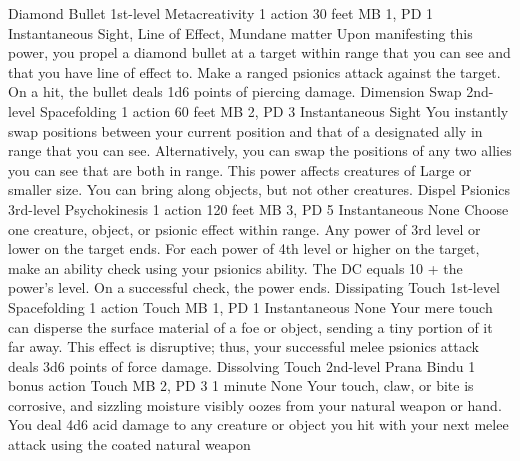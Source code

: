 \DndPowerHeader%
    {Diamond Bullet\label{pwr:diamond_bullet}}
    {1st-level Metacreativity}
    {1 action}
    {30 feet}
    {MB 1, PD 1}
    {Instantaneous}
    {Sight, Line of Effect, Mundane matter}
Upon manifesting this power, you propel a
diamond bullet at a target within range that you can see and
that you have line of effect to. Make a ranged psionics attack
against the target. On a hit, the bullet deals 1d6 points
of piercing damage.
\DndPowerHeader%
    {Dimension Swap\label{pwr:dimension_swap}}
    {2nd-level Spacefolding}
    {1 action}
    {60 feet}
    {MB 2, PD 3}
    {Instantaneous}
    {Sight}
You instantly swap positions between your
current position and that of a designated ally in range that
you can see. Alternatively, you can swap the positions of
any two allies you can see that are both in range. This power
affects creatures of Large or smaller size. You can bring
along objects, but not other creatures.
\DndPowerHeader%
    {Dispel Psionics\label{pwr:dispel_psionics}}
    {3rd-level Psychokinesis}
    {1 action}
    {120 feet}
    {MB 3, PD 5}
    {Instantaneous}
    {None}
Choose one creature, object, or psionic effect
within range. Any power of 3rd level or lower on the target
ends. For each power of 4th level or higher on the target,
make an ability check using your psionics ability. The DC
equals 10 + the power's level. On a successful check, the
power ends.
\DndPowerHeader%
    {Dissipating Touch\label{pwr:dissipating_touch}}
    {1st-level Spacefolding}
    {1 action}
    {Touch}
    {MB 1, PD 1}
    {Instantaneous}
    {None}
Your mere touch can disperse the surface
material of a foe or object, sending a tiny portion of it
far away. This effect is disruptive; thus, your successful
melee psionics attack deals 3d6 points of force damage.
\DndPowerHeader%
    {Dissolving Touch\label{pwr:dissolving_touch}}
    {2nd-level Prana Bindu}
    {1 bonus action}
    {Touch}
    {MB 2, PD 3}
    {1 minute}
    {None}
Your touch, claw, or bite is corrosive, and
sizzling moisture visibly oozes from your natural weapon or
hand. You deal 4d6 acid damage to any creature or object you
hit with your next melee attack using the coated natural weapon
